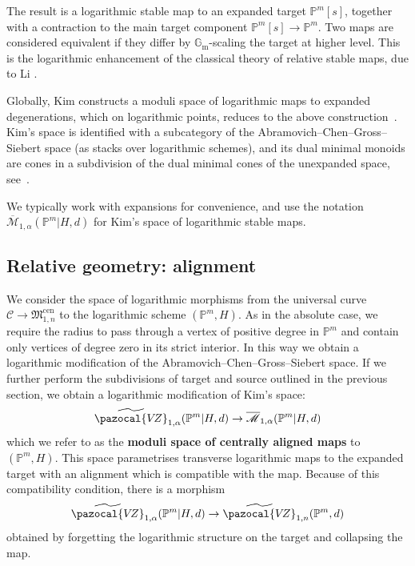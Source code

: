 \documentclass[11pt]{amsart}
\newcommand{\PP}{\mathbb P}
\newcommand{\VZ}{\pazocal{V\!Z}}
\renewcommand{\to}{\rightarrow}
\newcommand{\Gm}{\mathbb{G}_{\text{m}}}
\newcommand{\Mcal}{\mathcal{M}}
\newcommand{\ol}[1]{\overline{#1}}
\theoremstyle{definition}
\theoremstyle{definition}
\begin{document}
The result is a logarithmic stable map to an expanded target $\mathbb P^m[s]$, together with a contraction to the main target component $\mathbb P^m[s]\to\mathbb P^m$. Two maps are considered equivalent if they differ by $\Gm$-scaling the target at higher level. This is the logarithmic enhancement of the classical theory of relative stable maps, due to Li \cite{Li1,Li2}.

Globally, Kim constructs a moduli space of logarithmic maps to expanded degenerations, which on logarithmic points, reduces to the above construction~\cite{KimLog}. Kim's space is identified with a subcategory of the Abramovich--Chen--Gross--Siebert space (as stacks over logarithmic schemes), and its dual minimal monoids are cones in a subdivision of the dual minimal cones of the unexpanded space, see~\cite[\S~2]{R19}. 

We typically work with expansions for convenience, and use the notation
$\ol\Mcal_{1,\alpha}(\PP^m|H,d)$
for Kim's space of logarithmic stable maps.

\subsection{Relative geometry: alignment} We consider the space of logarithmic morphisms from the universal curve $\mathcal{C} \to \mathfrak{M}_{1,n}^{\mathrm{cen}}$ to the logarithmic scheme $(\PP^m,H)$. As in the absolute case, we require the radius to pass through a vertex of positive degree in $\PP^m$ and contain only vertices of degree zero in its strict interior. In this way we obtain a logarithmic modification of the Abramovich--Chen--Gross--Siebert space. If we further perform the subdivisions of target and source outlined in the previous section, we obtain a logarithmic modification of Kim's space:
\begin{equation*} \widetilde\VZ_{1,\alpha}(\PP^m|H,d) \to \ol\Mcal_{1,\alpha}(\PP^m|H,d)\end{equation*}
which we refer to as the \textbf{moduli space of centrally aligned maps} to $(\PP^m,H)$. This space parametrises transverse logarithmic maps to the expanded target with an alignment which is compatible with the map. Because of this compatibility condition, there is a morphism
\begin{equation*} \widetilde\VZ_{1,\alpha}(\PP^m|H,d) \to \widetilde\VZ_{1,n}(\PP^m,d)\end{equation*}
obtained by forgetting the logarithmic structure on the target and collapsing the map.
\end{document}
